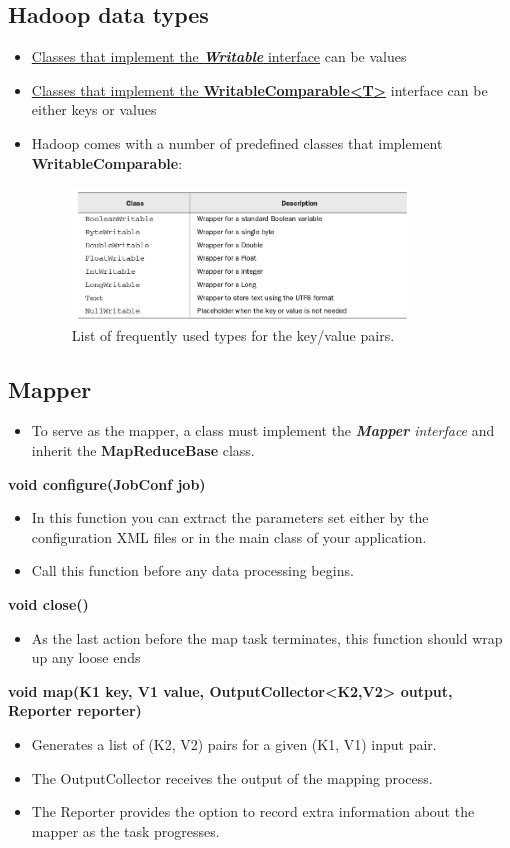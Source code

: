 \documentclass{article}
\begin{document}
\begin{multicols}{2}
\subsection {Hadoop data types}
\begin{itemize}
\item \underline{Classes that implement the \emph{\textbf{Writable}} interface} can be values
\item \underline{Classes that implement the \textbf{WritableComparable<T>}} interface can be either keys or values
\item Hadoop comes with a number of predefined classes that implement \textbf{WritableComparable}:
\begin{figure}[H]
\centering
\includegraphics[width=9cm]{assets/data_types.png}
\caption{List of frequently used types for the key/value pairs.}
\label{fig:awesome_image}
\end{figure}
\end{itemize}


\subsection {Mapper}
\begin{itemize}
\item To serve as the mapper, a class must implement the \emph{\textbf{Mapper} interface} and inherit the \textbf{MapReduceBase} class.
\end{itemize}
\textbf{void configure(JobConf job)} 
\begin{itemize}
\item In this function you can extract the parameters set either by the configuration XML files or in the main class of your application.
\item Call this function before any data processing begins.
\end{itemize}
\textbf{void close()}
\begin{itemize}
\item As the last action before the map task terminates, this function should wrap up any loose ends
\end{itemize}
\textbf{void map(K1 key, V1 value,
                  OutputCollector<K2,V2> output,
                  Reporter reporter)}
\begin{itemize}
\item Generates a list of (K2, V2) pairs for a given (K1, V1) input pair.
\item The OutputCollector receives the output of the mapping process.
\item The Reporter provides the option to record extra information about the mapper as the task progresses.
\end{itemize}


\end{multicols}
\end{document}

